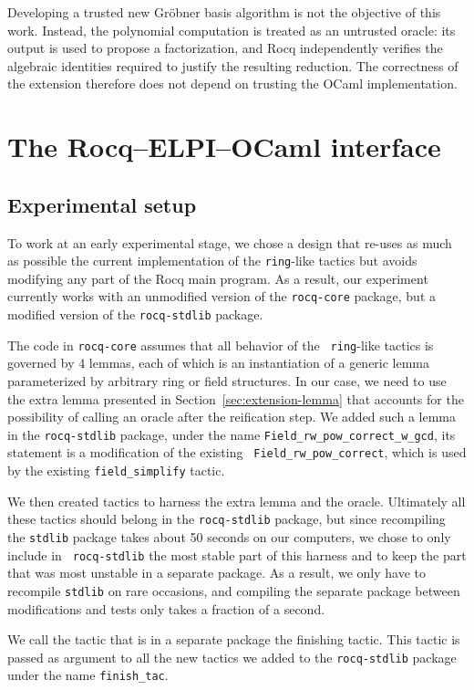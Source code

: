 \documentclass[11pt]{article}
\begin{document}
Developing a trusted new Gröbner basis algorithm is not the objective of this work. Instead, the polynomial computation is treated as an untrusted oracle: its output is used to propose a factorization, and Rocq independently verifies the algebraic identities required to justify the resulting reduction. The correctness of the extension therefore does not depend on trusting the OCaml implementation.


\section{The Rocq--ELPI--OCaml interface}
\subsection{Experimental setup}
To work at an early experimental stage, we chose a design that re-uses as
much as possible the current implementation of the {\tt ring}-like
tactics but avoids modifying
any part of the Rocq main program.  As a result, our experiment
currently works with an unmodified version of the {\tt rocq-core}
package, but a modified version of the {\tt rocq-stdlib} package.

The code in {\tt rocq-core} assumes that all behavior of the {\tt
  ring}-like tactics is governed by 4 lemmas, each of which is an
instantiation of a generic lemma parameterized by arbitrary ring or
field structures.  In our case, we need to use the extra lemma presented in
Section~\ref{sec:extension-lemma} that
accounts for the possibility of calling an oracle after the
reification step.  We added such a lemma in the {\tt rocq-stdlib}
package, under the name {\tt Field\_rw\_pow\_correct\_w\_gcd}, its
statement is a modification of the existing {\tt
  Field\_rw\_pow\_correct}, which is used by the existing
{\tt field\_simplify} tactic.

We then created tactics to harness the extra lemma and the oracle.
Ultimately all these tactics should belong in the {\tt rocq-stdlib}
package, but since recompiling the {\tt stdlib} package takes about 50
seconds on our computers, we chose to only include in {\tt
  rocq-stdlib} the most stable part of this harness
and to keep the part that was most unstable in a separate package.  As
a result, we only have to recompile {\tt stdlib} on rare occasions,
and compiling the separate package between modifications and tests
only takes a fraction of a second.

We call the tactic that is in a separate package the finishing tactic.
This tactic is passed as argument to all the new tactics we added to
the {\tt rocq-stdlib} package under the name {\tt finish\_tac}.
\end{document}
